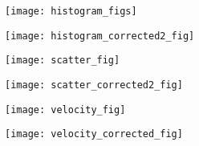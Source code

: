 \begin{figure*}[t!]
	\centering
	\begin{subfigure}{0.5\linewidth}
			\centering
	\texttt{[image: histogram\_figs]}
\caption{}
	\end{subfigure}\hfill
\begin{subfigure}{0.5\linewidth}
		\centering
	\texttt{[image: histogram\_corrected2\_fig]}
	\caption{}
\end{subfigure}
	\caption{}
	\label{fig:histogram}
\end{figure*}

\begin{figure*}[t!]
	\centering
	\begin{subfigure}{0.5\linewidth}
			\centering
		\texttt{[image: scatter\_fig]}
		\caption{}
	\end{subfigure}\hfill
	\begin{subfigure}{0.5\linewidth}
			\centering
		\texttt{[image: scatter\_corrected2\_fig]}
		\caption{}
	\end{subfigure}
	\caption{}
	\label{fig:scatter}
\end{figure*}


\begin{figure*}[t!]
	\centering
	\begin{subfigure}{0.5\linewidth}
		\centering
		\texttt{[image: velocity\_fig]}
		\caption{}
	\end{subfigure}\hfill
	\begin{subfigure}{0.5\linewidth}
		\centering
		\texttt{[image: velocity\_corrected\_fig]}
		\caption{}
	\end{subfigure}
	\caption{}
	\label{fig:velocity}
\end{figure*}




